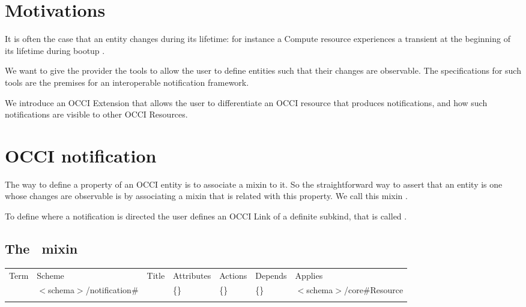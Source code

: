 \documentclass[10pt,a4paper]{article}
\begin{document}
\section{Motivations}

It is often the case that an entity changes during its lifetime: for instance a Compute resource experiences a transient at the beginning of its lifetime during bootup \cite{occi:infrastructure}.

We want to give the provider the tools to allow the user to define entities such that their changes are observable. The specifications for such tools are the premises for an interoperable notification framework.

We introduce an OCCI Extension that allows the user to differentiate an OCCI resource that produces notifications, and how such notifications are visible to other OCCI Resources.

\section{OCCI notification}

The way to define a property of an OCCI entity is to associate a mixin to it. So the straightforward way to assert that an entity is one whose changes are observable is by associating a mixin that is related with this property. We call this mixin \smx.

To define where a notification is directed the user defines an OCCI Link of a definite subkind, that is called \ntfl.



\subsection{The \smx\ mixin}

 {
	\begin{tabular}{lllllll}
	\toprule
	Term & Scheme & Title & Attributes & Actions & Depends & Applies \\
	\colrule
	\ntfl &  $<$schema$>$/notification\# & \smx 
	& \{\} & \{\} & \{\} & $<$schema$>$/core\#Resource \\
	\botrule
	\end{tabular}
}
\end{document}
